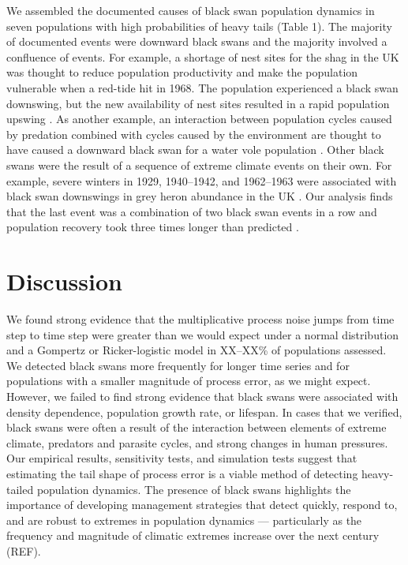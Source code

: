 We assembled the documented causes of black swan population dynamics in seven
populations with high probabilities of heavy tails (Table 1). The majority of
documented events were downward black swans and the majority involved
a confluence of events. For example, a shortage of nest sites for the shag in
the UK was thought to reduce population productivity and make the population
vulnerable when a red-tide hit in 1968. The population experienced a black swan
downswing, but the new availability of nest sites resulted in a rapid
population upswing \citep{potts1980}. As another example, an interaction
between population cycles caused by predation combined with cycles caused by
the environment are thought to have caused a downward black swan for a water
vole population \citep{saucy1994}. Other black swans were the result of
a sequence of extreme climate events on their own. For example, severe winters
in 1929, 1940--1942, and 1962--1963 were associated with black swan downswings
in grey heron abundance in the UK \citep{stafford1971}. Our analysis finds that
the last event was a combination of two black swan events in a row and
population recovery took three times longer than predicted
\citep{stafford1971}.

\section{Discussion}

We found strong evidence that the multiplicative process noise jumps from time
step to time step were greater than we would expect under a normal distribution
and a Gompertz or Ricker-logistic model in XX--XX\% of populations assessed. We
detected black swans more frequently for longer time series and for populations
with a smaller magnitude of process error, as we might expect. However, we
failed to find strong evidence that black swans were associated with density
dependence, population growth rate, or lifespan. In cases that we verified,
black swans were often a result of the interaction between elements of extreme
climate, predators and parasite cycles, and strong changes in human pressures.
Our empirical results, sensitivity tests, and simulation tests suggest that
estimating the tail shape of process error is a viable method of detecting
heavy-tailed population dynamics. The presence of black swans highlights the
importance of developing management strategies that detect quickly, respond to,
and are robust to extremes in population dynamics --- particularly as the
frequency and magnitude of climatic extremes increase over the next century
(REF).

